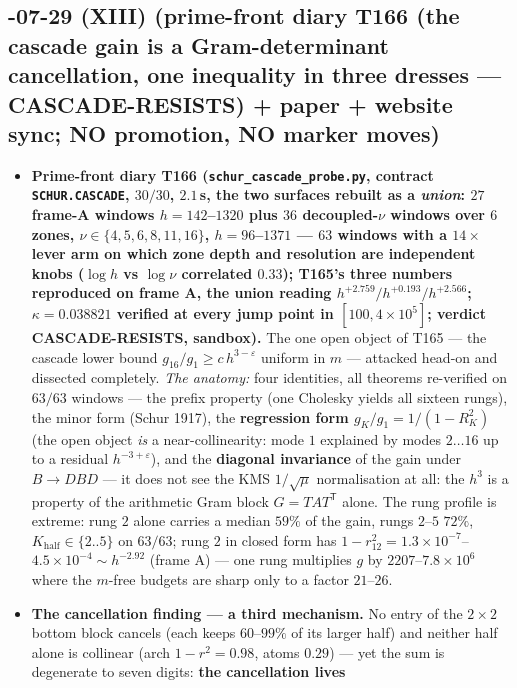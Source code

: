 \documentclass[11pt]{article}
\begin{document}
\subsection*{-07-29 (XIII) (prime-front diary T166 (the cascade gain is a Gram-determinant cancellation, one inequality in three dresses --- CASCADE-RESISTS) + paper + website sync; NO promotion, NO marker moves)}
\begin{itemize}[leftmargin=1.5em]
\item \textbf{Prime-front diary T166 (\texttt{schur\_cascade\_probe.py}, contract
\texttt{SCHUR.CASCADE}, $30/30$, $2.1$\,s, the two surfaces rebuilt as a
\emph{union}: $27$ frame-A windows $h=142$--$1320$ plus $36$ decoupled-$\nu$
windows over $6$ zones, $\nu\in\{4,5,6,8,11,16\}$, $h=96$--$1371$ --- $63$
windows with a $14\times$ lever arm on which zone depth and resolution are
independent knobs ($\log h$ vs $\log\nu$ correlated $0.33$); T165's three
numbers reproduced on frame A, the union reading
$h^{+2.759}/h^{+0.193}/h^{+2.566}$; $\kappa=0.038821$ verified at every jump
point in $[100,4\times10^{5}]$; verdict CASCADE-RESISTS, sandbox).} The one
open object of T165 --- the cascade lower bound $g_{16}/g_1\ge c\,h^{3-\varepsilon}$
uniform in $m$ --- attacked head-on and dissected completely. \emph{The
anatomy:} four identities, all theorems re-verified on $63/63$ windows ---
the prefix property (one Cholesky yields all sixteen rungs), the minor form
(Schur 1917), the \textbf{regression form $g_K/g_1=1/(1-R_K^2)$} (the open
object \emph{is} a near-collinearity: mode $1$ explained by modes $2\ldots16$
up to a residual $h^{-3+\varepsilon}$), and the \textbf{diagonal invariance}
of the gain under $B\to DBD$ --- it does not see the KMS $1/\sqrt{\mu}$
normalisation at all: the $h^3$ is a property of the arithmetic Gram block
$G=TAT^{\mathsf T}$ alone. The rung profile is extreme: rung $2$ alone
carries a median $59\%$ of the gain, rungs $2$--$5$ $72\%$,
$K_{\mathrm{half}}\in\{2..5\}$ on $63/63$; rung $2$ in closed form has
$1-r_{12}^2=1.3\times10^{-7}$--$4.5\times10^{-4}\sim h^{-2.92}$ (frame A) ---
one rung multiplies $g$ by $2207$--$7.8\times10^{6}$ where the $m$-free
budgets are sharp only to a factor $21$--$26$.
\item \textbf{The cancellation finding --- a third mechanism.} No entry of
the $2\times2$ bottom block cancels (each keeps $60$--$99\%$ of its larger
half) and neither half alone is collinear (arch $1-r^2=0.98$, atoms $0.29$)
--- yet the sum is degenerate to seven digits: \textbf{the cancellation lives
}
\end{itemize}
\end{document}
